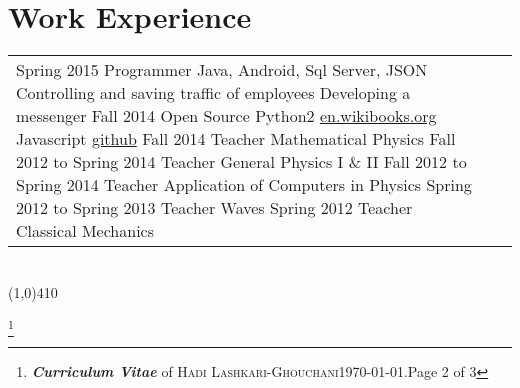 \documentclass[10pt]{article}
\newcommand\HRule{\hspace*{.8cm}\line(1,0){410}\\}
\newenvironment{Record}[1]
{
    \vspace{-0.35cm}
    \section*{#1}
        \vspace{-0.1cm}
        \begin{tabular}
}
{
        \end{tabular}\\
        \HRule
}
\newcommand{\FootNote}[2]{\let\thefootnote\relax\footnote{\textbf{\textit{Curriculum Vitae}} of \textsc{Hadi Lashkari-Ghouchani}\qquad\today.\qquad Page #1 of #2}}
\begin{document}
\begin{Record}{Work Experience}{l l l}
    \WorkExperience{\href{http://sohasys.ir}{Soha Company}}
        {Spring 2015}
        {Programmer}
        {Java, Android, Sql Server, JSON}
        {Controlling and saving traffic of employees}
        {Developing a messenger}
        {}%
    \WorkExperience{Persian Calendar}
        {Fall 2014}
        {Open Source}
        {Python2}
        {\href{http://en.wikibooks.org/wiki/Persian_Calendar}{en.wikibooks.org}}
        {Javascript}
        {\href{http://github.com/hadilq/persianCalendar}{github}}
    \WorkExperience{Payame-Noor University}
        {Fall 2014}
        {Teacher}
        {Mathematical Physics}
        {}{}{}%
    \WorkExperience{Sadjad University}
        {Fall 2012 to Spring 2014}
        {Teacher}
        {General Physics I \& II}
        {}{}{}%
    \WorkExperience{Payame-Noor University}
        {Fall 2012 to Spring 2014}
        {Teacher}
        {Application of Computers in Physics}
        {}{}{}%
    \WorkExperience{Payame-Noor University}
        {Spring 2012 to Spring 2013}
        {Teacher}
        {Waves}
        {}{}{}%
    \WorkExperience{Payame-Noor University}
        {Spring 2012}
        {Teacher}
        {Classical Mechanics}
        {}{}{}%
\end{Record}



\FootNote{2}{3}


\newcommand{\Reference}[5]{
    \multicolumn{2}{l}{\textbf{\textsl{ #1}}}\\
    \quad#2&\textit{#3}\\
    &\textit{#4}\\
    &\textit{#5}\\
}
\end{document}
